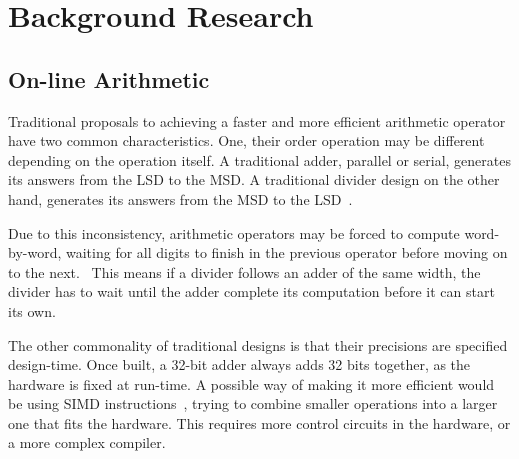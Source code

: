 \section{Background Research}

\subsection{On-line Arithmetic}
Traditional proposals to achieving a faster and more efficient arithmetic
operator have two common characteristics.
One, their order operation may be different depending on the operation itself.
A traditional adder, parallel or serial, generates its answers from the LSD to
the MSD.
A traditional divider design on the other hand, generates its answers from
the MSD to the LSD~\cite{Brent1}\cite{Srinivas1}.

Due to this inconsistency, arithmetic operators may be forced to compute
word-by-word, waiting for all digits to finish in the previous operator before
moving on to the next.~\cite{Zhao1}
This means if a divider follows an adder of the same width, the divider has to
wait until the adder complete its computation before it can start its own.

The other commonality of traditional designs is that their precisions are
specified design-time. Once built, a 32-bit adder always adds 32 bits together,
as the hardware is fixed at run-time.
A possible way of making it more efficient would be using SIMD
instructions~\cite{Duncan1}, trying to combine smaller operations into a larger
one that fits the hardware.
This requires more control circuits in the hardware, or a more complex compiler.

